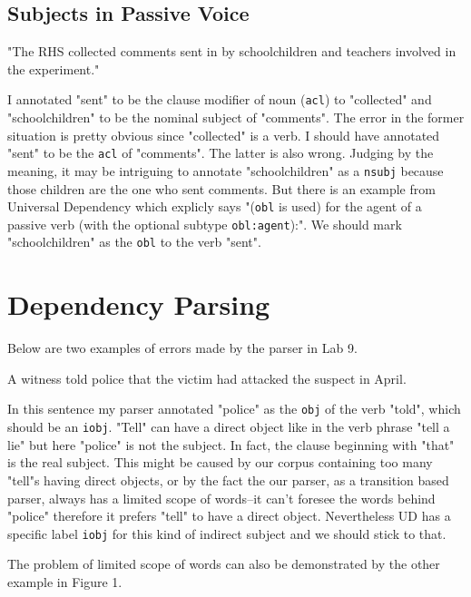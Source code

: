 \documentclass[11pt]{article} %
\begin{document}
\subsection{Subjects in Passive Voice}

\begin{displayquote}
  "The RHS collected comments sent in by schoolchildren and teachers involved in the experiment."
\end{displayquote}

I annotated "sent" to be the clause modifier of noun (\texttt{acl}) to "collected" and "schoolchildren" to be the nominal subject of "comments". The error in the former situation is pretty obvious since "collected" is a verb\cite{AclUD}. I should have annotated "sent" to be the \texttt{acl} of "comments". The latter is also wrong. Judging by the meaning, it may be intriguing to annotate "schoolchildren" as a \texttt{nsubj} because those children are the one who sent comments. But there is an example from Universal Dependency which explicly says "(\texttt{obl} is used) for the agent of a passive verb (with the optional subtype \texttt{obl:agent}):"\cite{OblUD}. We should mark "schoolchildren" as the \texttt{obl} to the verb "sent".

\section{Dependency Parsing}

Below are two examples of errors made by the parser in Lab 9.

\begin{displayquote}
  A witness told police that the victim had attacked the suspect in April.
\end{displayquote}

In this sentence my parser annotated "police" as the \texttt{obj} of the verb "told", which should be an \texttt{iobj}. "Tell" can have a direct object like in the verb phrase "tell a lie" but here "police" is not the subject. In fact, the clause beginning with "that" is the real subject. This might be caused by our corpus containing too many "tell"s having direct objects, or by the fact the our parser, as a transition based parser, always has a limited scope of words--it can't foresee the words behind "police" therefore it prefers "tell" to have a direct object. Nevertheless UD has a specific label \texttt{iobj} for this kind of indirect subject\cite{IobjUD} and we should stick to that.

The problem of limited scope of words can also be demonstrated by the other example in Figure 1.
\end{document}
